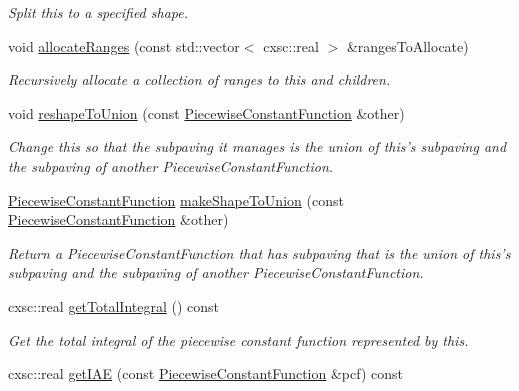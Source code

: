 \begin{DoxyCompactItemize}
\begin{DoxyCompactList}\small\item\em \-Split this to a specified shape. \end{DoxyCompactList}\item 
void \hyperlink{classsubpavings_1_1PiecewiseConstantFunction_a24005b5dad3a4417de9d6fc68462258f}{allocate\-Ranges} (const std\-::vector$<$ cxsc\-::real $>$ \&ranges\-To\-Allocate)
\begin{DoxyCompactList}\small\item\em \-Recursively allocate a collection of ranges to this and children. \end{DoxyCompactList}\item 
void \hyperlink{classsubpavings_1_1PiecewiseConstantFunction_a95d2cd2a73cf7a3ac06a433a35098179}{reshape\-To\-Union} (const \hyperlink{classsubpavings_1_1PiecewiseConstantFunction}{\-Piecewise\-Constant\-Function} \&other)
\begin{DoxyCompactList}\small\item\em \-Change this so that the subpaving it manages is the union of this's subpaving and the subpaving of another \-Piecewise\-Constant\-Function. \end{DoxyCompactList}\item 
\hyperlink{classsubpavings_1_1PiecewiseConstantFunction}{\-Piecewise\-Constant\-Function} \hyperlink{classsubpavings_1_1PiecewiseConstantFunction_adb8c06d489bebfe579823751033b7bcd}{make\-Shape\-To\-Union} (const \hyperlink{classsubpavings_1_1PiecewiseConstantFunction}{\-Piecewise\-Constant\-Function} \&other)
\begin{DoxyCompactList}\small\item\em \-Return a \-Piecewise\-Constant\-Function that has subpaving that is the union of this's subpaving and the subpaving of another \-Piecewise\-Constant\-Function. \end{DoxyCompactList}\item 
cxsc\-::real \hyperlink{classsubpavings_1_1PiecewiseConstantFunction_ade6c94a0c5b7ffc5ec2ca5ab5e9c6375}{get\-Total\-Integral} () const 
\begin{DoxyCompactList}\small\item\em \-Get the total integral of the piecewise constant function represented by this. \end{DoxyCompactList}\item 
cxsc\-::real \hyperlink{classsubpavings_1_1PiecewiseConstantFunction_a2499c322fa30a4f07d8ad7360a8d7d95}{get\-I\-A\-E} (const \hyperlink{classsubpavings_1_1PiecewiseConstantFunction}{\-Piecewise\-Constant\-Function} \&pcf) const 

\end{DoxyCompactItemize}
